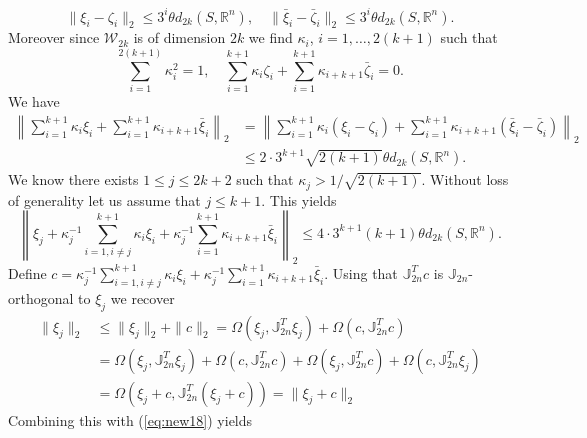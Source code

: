\begin{equation}
	\| \xi_i - \zeta_i \|_2 \leq 3^i \theta d_{2k}(S,\mathbb R^n),\quad \| \bar{\xi}_i - \bar{\zeta}_i \|_2 \leq 3^i \theta d_{2k}(S,\mathbb R^n).
\end{equation}
Moreover since $\mathcal W_{2k}$ is of dimension $2k$ we find $\kappa_i$, $i=1,\dots,2(k+1)$ such that
\begin{equation} \label{eq:new15}
	\sum_{i=1}^{2(k+1)} \kappa_i^2 = 1, \quad\sum_{i=1}^{k+1} \kappa_i \zeta_i + \sum_{i=1}^{k+1} \kappa_{i+k+1} \bar{\zeta}_i = 0.
\end{equation}
We have
\begin{equation} \label{eq:new17}
\begin{aligned}
	\left\| \sum_{i=1}^{k+1} \kappa_i \xi_i + \sum_{i=1}^{k+1} \kappa_{i+k+1} \bar{\xi}_i \right\|_2 &= \left\| \sum_{i=1}^{k+1} \kappa_i (\xi_i - \zeta_i) + \sum_{i=1}^{k+1} \kappa_{i+k+1} (\bar{\xi}_i-\bar{\zeta}_i) \right\|_2 \\
	&\leq 2\cdot 3^{k+1} \sqrt{2(k+1)} \theta d_{2k}(S,\mathbb R^n).
\end{aligned}
\end{equation}
We know there exists $1 \leq j\leq 2k+2$ such that $\kappa_j > 1/\sqrt{2(k+1)}$. Without loss of generality let us assume that $j\leq k+1$. This yields
\begin{equation} \label{eq:new18}
	\left\| \xi_j +  \kappa_j^{-1} \sum_{i=1,i\neq j}^{k+1} \kappa_i \xi_i + \kappa_j^{-1}\sum_{i=1}^{k+1} \kappa_{i+k+1} \bar{\xi}_i \right\|_2 \leq 4\cdot 3^{k+1} (k+1) \theta d_{2k}(S,\mathbb R^n).
\end{equation}
Define $c = \kappa_j^{-1} \sum_{i=1,i\neq j}^{k+1} \kappa_i \xi_i + \kappa_j^{-1}\sum_{i=1}^{k+1} \kappa_{i+k+1} \bar{\xi}_i$. Using that $\mathbb{J}_{2n}^T c$ is $\mathbb J_{2n}$-orthogonal to $\xi_j$ we recover
\begin{equation} \label{eq:new19}
\begin{aligned}
	\| \xi_j \|_2 &\leq \| \xi_j \|_2 + \| c \|_2 = \Omega(\xi_j,\mathbb{J}_{2n}^T \xi_j) + \Omega(c,\mathbb{J}_{2n}^T c) \\
	       &= \Omega(\xi_j,\mathbb{J}_{2n}^T \xi_j) + \Omega(c,\mathbb{J}_{2n}^T c) + \Omega(\xi_j,\mathbb{J}_{2n}^T c) + \Omega(c,\mathbb{J}_{2n}^T \xi_j) \\
       	&= \Omega(\xi_j + c, \mathbb{J}^T_{2n} (\xi_j + c)) = \| \xi_j + c \|_2	
\end{aligned}
\end{equation}
Combining this with (\ref{eq:new18}) yields
